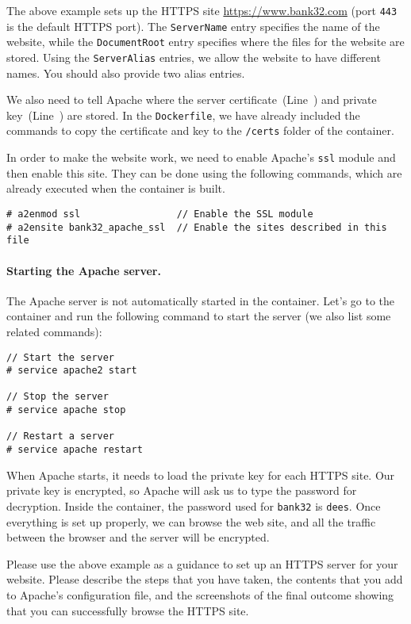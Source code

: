 The above example sets up the HTTPS site \url{https://www.bank32.com} (port \texttt{443} 
is the default HTTPS port). 
The \texttt{ServerName} entry specifies the name of the website, while
the \texttt{DocumentRoot} entry specifies where the files for 
the website are stored. Using the \texttt{ServerAlias} entries, we allow
the website to have different names. You should also provide two
alias entries. 

We also need to tell Apache where
the server certificate~(Line~) and private key~(Line~) are stored. 
In the \texttt{Dockerfile}, we have already included the commands to copy
the certificate and key to the \texttt{/certs} folder of the container.  


In order to make the website work, we need to enable Apache's \texttt{ssl} module and 
then enable this site. They can be done using the following commands, 
which are already executed when the container is built. 

\begin{lstlisting}
# a2enmod ssl                 // Enable the SSL module 
# a2ensite bank32_apache_ssl  // Enable the sites described in this file
\end{lstlisting}
 


\paragraph{Starting the Apache server.} The Apache server 
is not automatically started in the container. Let's go to the container and 
run the following command to start the server (we also list
some related commands): 


\begin{lstlisting}
// Start the server 
# service apache2 start

// Stop the server 
# service apache stop

// Restart a server 
# service apache restart
\end{lstlisting}


When Apache starts, it needs to load the private key for each HTTPS 
site. Our private key is encrypted, so Apache will ask us to type the password 
for decryption. Inside the container, the password used for \texttt{bank32}
is \texttt{dees}.  Once everything is set up properly, we can
browse the web site, and all the traffic between the browser and the server 
will be encrypted.


Please use the above example as a guidance to set up an HTTPS server for 
your website. Please describe the steps that 
you have taken, the contents that you add to Apache's configuration file, and 
the screenshots of the final outcome showing that you can successfully browse
the HTTPS site. 



